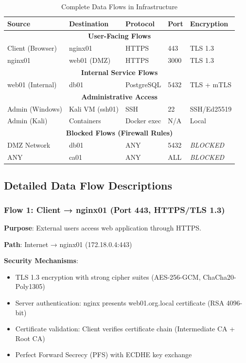 \begin{table}[H]
\centering
\small
\begin{tabular}{lllll}
\toprule
\textbf{Source} & \textbf{Destination} & \textbf{Protocol} & \textbf{Port} & \textbf{Encryption} \\
\midrule
\multicolumn{5}{c}{\textbf{User-Facing Flows}} \\
\midrule
Client (Browser) & nginx01 & HTTPS & 443 & TLS 1.3 \\
nginx01 & web01 (DMZ) & HTTPS & 3000 & TLS 1.3 \\
\midrule
\multicolumn{5}{c}{\textbf{Internal Service Flows}} \\
\midrule
web01 (Internal) & db01 & PostgreSQL & 5432 & TLS + mTLS \\
\midrule
\multicolumn{5}{c}{\textbf{Administrative Access}} \\
\midrule
Admin (Windows) & Kali VM (ssh01) & SSH & 22 & SSH/Ed25519 \\
Admin (Kali) & Containers & Docker exec & N/A & Local \\
\midrule
\multicolumn{5}{c}{\textbf{Blocked Flows (Firewall Rules)}} \\
\midrule
DMZ Network & db01 & ANY & 5432 & \textit{BLOCKED} \\
ANY & ca01 & ANY & ALL & \textit{BLOCKED} \\
\bottomrule
\end{tabular}
\caption{Complete Data Flows in Infrastructure}
\end{table}

\subsection{Detailed Data Flow Descriptions}

\subsubsection{Flow 1: Client → nginx01 (Port 443, HTTPS/TLS 1.3)}

\textbf{Purpose}: External users access web application through HTTPS.

\textbf{Path}: Internet → nginx01 (172.18.0.4:443)

\textbf{Security Mechanisms}:
\begin{itemize}
    \item TLS 1.3 encryption with strong cipher suites (AES-256-GCM, ChaCha20-Poly1305)
    \item Server authentication: nginx presents web01.org.local certificate (RSA 4096-bit)
    \item Certificate validation: Client verifies certificate chain (Intermediate CA + Root CA)
    \item Perfect Forward Secrecy (PFS) with ECDHE key exchange
\end{itemize}

